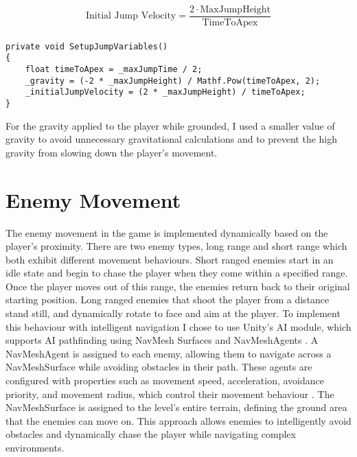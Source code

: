 \documentclass[]{final_report}
\begin{document}
\begin{equation}
\text{Initial Jump Velocity} = \frac{2 \cdot \text{MaxJumpHeight}}{\text{TimeToApex}}
\end{equation}
\paragraph{}
\begin{verbatim}
private void SetupJumpVariables()
{
    float timeToApex = _maxJumpTime / 2;
    _gravity = (-2 * _maxJumpHeight) / Mathf.Pow(timeToApex, 2);
    _initialJumpVelocity = (2 * _maxJumpHeight) / timeToApex;
}
\end{verbatim}
For the gravity applied to the player while grounded, I used a smaller value of gravity to avoid unnecessary gravitational calculations and to prevent the high gravity from slowing down the player's movement. \newline

\section{Enemy Movement}\label{enemy_movement}
The enemy movement in the game is implemented dynamically based on the player's proximity. \color{red} There are two enemy types, long range and short range which both exhibit different movement behaviours. Short ranged enemies start in an idle state and begin to chase the player when they come within a specified range. Once the player moves out of this range, the enemies return back to their original starting position. Long ranged enemies that shoot the player from a distance stand still, and dynamically rotate to face and aim at the player. \color{black} To implement this behaviour with intelligent navigation I chose to use Unity's AI module, which supports AI pathfinding using NavMesh Surfaces and NavMeshAgents \cite{unity2024_AI}. 
A NavMeshAgent is assigned to each enemy, allowing them to navigate across a NavMeshSurface while avoiding obstacles in their path. These agents are configured with properties such as movement speed, acceleration, avoidance priority, and movement radius, which control their movement behaviour \cite{unity2024_NavAgent}. The NavMeshSurface is assigned to the level's entire terrain, defining the ground area that the enemies can move on. This approach allows enemies to intelligently avoid obstacles and dynamically chase the player while navigating complex environments. \newline
\end{document}
